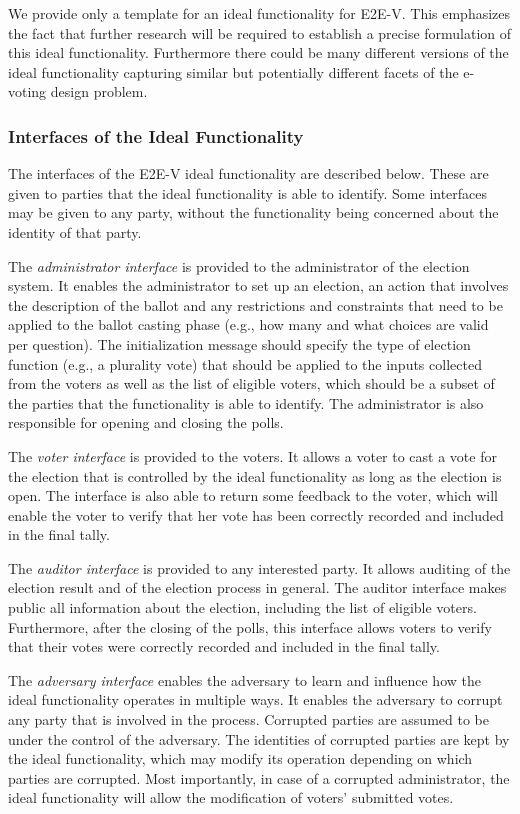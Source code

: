 We provide only a template for an ideal functionality for E2E-V. This
emphasizes the fact that further research will be required to
establish a precise formulation of this ideal
functionality. Furthermore there could be many different versions of
the ideal functionality capturing similar but potentially different
facets of the e-voting design problem.

\subsubsection{Interfaces of the Ideal Functionality}

The interfaces of the E2E-V ideal functionality are described
below. These are given to parties that the ideal functionality is able
to identify. Some interfaces may be given to any party, without the
functionality being concerned about the identity of that party.

The \emph{administrator interface} is provided to the administrator of
the election system.  It enables the administrator to set up an
election, an action that involves the description of the ballot and
any restrictions and constraints that need to be applied to the ballot
casting phase (e.g., how many and what choices are valid per
question). The initialization message should specify the type of
election function (e.g., a plurality vote) that should be applied to
the inputs collected from the voters as well as the list of eligible
voters, which should be a subset of the parties that the functionality
is able to identify. The administrator is also responsible for opening
and closing the polls.

The \emph{voter interface} is provided to the voters. It allows a
voter to cast a vote for the election that is controlled by the ideal
functionality as long as the election is open. The interface is also
able to return some feedback to the voter, which will enable the voter
to verify that her vote has been correctly recorded and included in
the final tally.

The \emph{auditor interface} is provided to any interested party.  It
allows auditing of the election result and of the election process in
general. The auditor interface makes public all information about the
election, including the list of eligible voters. Furthermore, after the
closing of the polls, this interface allows voters to verify that
their votes were correctly recorded and included in the final tally. 

The \emph{adversary interface} enables the adversary to learn and
influence how the ideal functionality operates in multiple ways. It
enables the adversary to corrupt any party that is involved in the
process. Corrupted parties are assumed to be under the control of the
adversary. The identities of corrupted parties are kept by the ideal
functionality, which may modify its operation depending on which
parties are corrupted. Most importantly, in case of a corrupted
administrator, the ideal functionality will allow the modification of
voters’ submitted votes.

